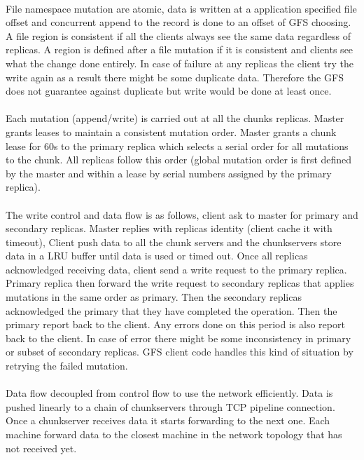 \documentclass[8pt]{extarticle}
\begin{document}
	\paragraph{}
	File namespace mutation are atomic, data is written at a application specified file offset and concurrent append to the record is done to an offset of GFS choosing. A file region is consistent if all the clients always see the same data regardless of replicas. A region is defined after a file mutation if it is consistent and clients see what the change done entirely. In case of failure at any replicas the client try the write again as a result there might be some duplicate data. Therefore the GFS does not guarantee against duplicate but write would be done at least once.
	
	\paragraph{}
	Each mutation (append/write) is carried out at all the chunks replicas. Master grants leases to maintain a consistent mutation order. Master grants a chunk lease for 60s to the primary replica which selects a serial order for all mutations to the chunk. All replicas follow  this order (global mutation order is first defined by the master and within a lease by serial numbers assigned by the primary replica).
	
	\paragraph{}
	The write control and data flow is as follows, client ask to master for primary and secondary replicas. Master replies with replicas identity (client cache it with timeout), Client push data to all the chunk servers and the chunkservers store data in a LRU buffer until data is used or timed out. Once all replicas acknowledged receiving data, client send a write request to the primary replica. Primary replica then  forward the write request to secondary  replicas that applies mutations in the same order as primary. Then the secondary  replicas acknowledged the primary that they have completed the operation. Then the primary  report back to the client. Any errors done on this period is also report back to the client. In case of error there might be some inconsistency in primary or subset of secondary replicas. GFS client code handles this kind of situation by retrying the failed mutation.
	
	\paragraph{}
	Data flow decoupled from control flow to use the network efficiently. Data is pushed linearly to a chain of chunkservers through TCP pipeline connection. Once a chunkserver receives data it starts forwarding to the next one. Each machine forward data to the closest machine in the network topology that has not received yet.
	
\end{document}
